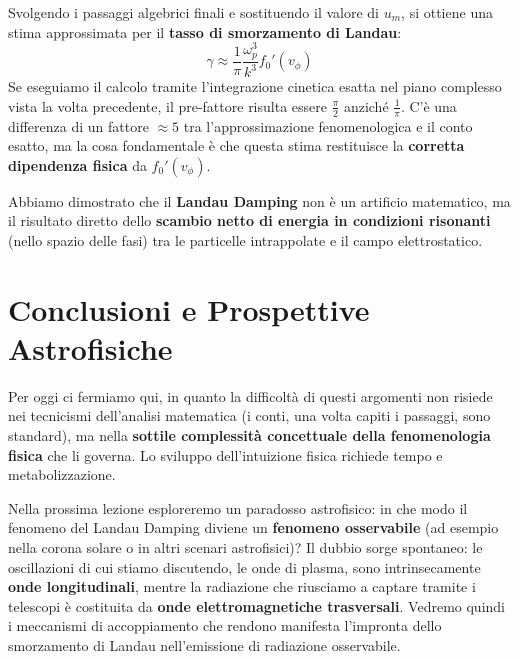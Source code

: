 Svolgendo i passaggi algebrici finali e sostituendo il valore di $u_m$, si ottiene una stima approssimata per il \textbf{tasso di smorzamento di Landau}:
\begin{equation}
\gamma \approx \frac{1}{\pi} \frac{\omega_p^3}{k^3} f_0'(v_\phi)
\end{equation}
Se eseguiamo il calcolo tramite l'integrazione cinetica esatta nel piano complesso vista la volta precedente, il pre-fattore risulta essere $\frac{\pi}{2}$ anziché $\frac{1}{\pi}$. C'è una differenza di un fattore $\approx 5$ tra l'approssimazione fenomenologica e il conto esatto, ma la cosa fondamentale è che questa stima restituisce la \textbf{corretta dipendenza fisica} da $f_0'(v_\phi)$.

Abbiamo dimostrato che il \textbf{Landau Damping} non è un artificio matematico, ma il risultato diretto dello \textbf{scambio netto di energia in condizioni risonanti} (nello spazio delle fasi) tra le particelle intrappolate e il campo elettrostatico.

\section{Conclusioni e Prospettive Astrofisiche}

Per oggi ci fermiamo qui, in quanto la difficoltà di questi argomenti non risiede nei tecnicismi dell'analisi matematica (i conti, una volta capiti i passaggi, sono standard), ma nella \textbf{sottile complessità concettuale della fenomenologia fisica} che li governa. Lo sviluppo dell'intuizione fisica richiede tempo e metabolizzazione.

Nella prossima lezione esploreremo un paradosso astrofisico: in che modo il fenomeno del Landau Damping diviene un \textbf{fenomeno osservabile} (ad esempio nella corona solare o in altri scenari astrofisici)?
Il dubbio sorge spontaneo: le oscillazioni di cui stiamo discutendo, le onde di plasma, sono intrinsecamente \textbf{onde longitudinali}, mentre la radiazione che riusciamo a captare tramite i telescopi è costituita da \textbf{onde elettromagnetiche trasversali}. Vedremo quindi i meccanismi di accoppiamento che rendono manifesta l'impronta dello smorzamento di Landau nell'emissione di radiazione osservabile.